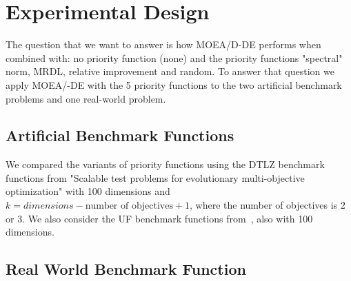 \section{Experimental Design}

%


The question that we want to answer is how MOEA/D-DE performs when combined with: no priority function (none) and the priority functions "spectral" norm, MRDL, relative improvement and random. To answer that question we apply MOEA/-DE with the 5 priority functions to the two artificial benchmark problems and one real-world problem.

\subsection{Artificial Benchmark Functions}

We compared the variants of priority functions using the DTLZ benchmark functions from "Scalable test problems for evolutionary multi-objective optimization" with 100 dimensions and $k = dimensions - \text{number of objectives} + 1$, where the number of objectives is $2$ or $3$. We also consider the UF benchmark functions from~\cite{zhang2008multiobjective}, also with 100 dimensions. 

\subsection{Real World Benchmark Function}


